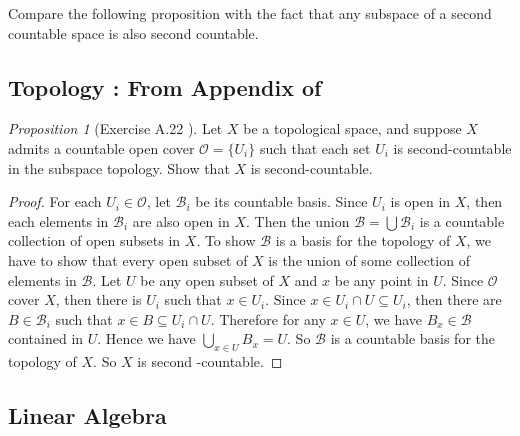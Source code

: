 \documentclass[a4paper]{article}
\theoremstyle{remark}
\newtheorem{prop}{Proposition}
\newcommand{\subhim}{\subseteq} %
\begin{document}
Compare the following proposition with the fact that any subspace of a second countable space is also second countable.

\subsection*{Topology : From Appendix of \cite{LeeSM}}
\begin{prop}[Exercise A.22 \cite{LeeSM}]\label{Exercise A.22}
Let $X$ be a topological space, and suppose $X$ admits a countable open cover $\mathcal{O} =\{U_i\}$ such that each set $U_i$ is second-countable in the subspace topology. Show that $X$ is second-countable.
\end{prop}
\begin{proof}
For each $U_i \in \mathcal{O}$, let $\mathcal{B}_i$ be its countable basis. Since $U_i$ is open in $X$, then each elements in $\mathcal{B}_i$ are also open in $X$. Then the union $\mathcal{B} = \bigcup \mathcal{B}_i$ is a countable collection of open subsets in $X$. To show $\mathcal{B}$ is a basis for the topology of $X$, we have to show that every open subset of $X$ is the union of some collection of elements in $\mathcal{B}$. Let $U$ be any open subset of $X$ and $x$ be any point in $U$. Since $\mathcal{O}$ cover $X$, then there is $U_i$ such that $x \in U_i$. Since $x \in U_i \cap U \subhim U_i$, then there are $B \in \mathcal{B}_i$ such that $x \in B \subhim U_i \cap U$. Therefore for any $x \in U$, we have $B_x \in \mathcal{B}$ contained in $U$. Hence we have $\bigcup_{x\in U}B_x = U$. So $\mathcal{B}$ is a countable basis for the topology of $X$. So $X$ is second -countable.
\end{proof}


\subsection*{Linear Algebra}
\end{document}
